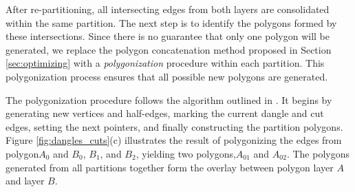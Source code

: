 After re-partitioning, all intersecting edges from both layers are consolidated within the same partition. The next step is to identify the polygons formed by these intersections. Since there is no guarantee that only one polygon will be generated, we replace the polygon concatenation method proposed in Section \ref{sec:optimizing} with a \textit{polygonization} procedure within each partition. This polygonization process ensures that all possible new polygons are generated.

The polygonization procedure follows the algorithm outlined in \cite{abdelhafeez_ddcel_2023}. It begins by generating new vertices and half-edges, marking the current dangle and cut edges, setting the next pointers, and finally constructing the partition polygons. Figure \ref{fig:dangles_cuts}(c) illustrates the result of polygonizing the edges from polygon$A_0$ and $B_0$, $B_1$, and $B_2$, yielding two polygons,$A_01$ and $A_02$.  The polygons generated from all partitions together form the overlay between polygon layer $A$ and layer $B$.

